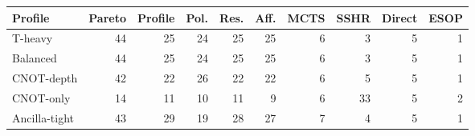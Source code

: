 \begin{tabular}{@{}lrrrrrrrrr@{}}
\toprule
Profile & Pareto & Profile & Pol. & Res. & Aff. & MCTS & SSHR & Direct & ESOP \\
\midrule
T-heavy & 44 & 25 & 24 & 25 & 25 & 6 & 3 & 5 & 1 \\
Balanced & 44 & 25 & 24 & 25 & 25 & 6 & 3 & 5 & 1 \\
CNOT-depth & 42 & 22 & 26 & 22 & 22 & 6 & 5 & 5 & 1 \\
CNOT-only & 14 & 11 & 10 & 11 & 9 & 6 & 33 & 5 & 2 \\
Ancilla-tight & 43 & 29 & 19 & 28 & 27 & 7 & 4 & 5 & 1 \\
\bottomrule
\end{tabular}
